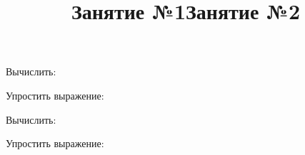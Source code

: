 \title{Занятие №1}
\begin{listofex}
	\item {}
	\item {}
	\item {}
	\item {}
	\item {}
	\item Вычислить:
	\begin{enumcols}[itemcolumns=3]
		\item {}
		\item {}
		\item {}
	\end{enumcols}
	\item {}
	\item {}
	\item {}
	\item {}
	\item {}
	\item Упростить выражение:
	\begin{enumcols}[itemcolumns=2]
		\item {}
		\item {}
	\end{enumcols}
\end{listofex}
\newpage
\title{Занятие №2}
\begin{listofex}
	\item {}
	\item {}
	\item {}
	\item {}
	\item {}
	\item Вычислить:
	\begin{enumcols}[itemcolumns=3]
		\item {}
		\item {}
		\item {}
	\end{enumcols}
	\item {}
	\item {}
	\item {}
	\item {} 
	\item {}
	\item Упростить выражение:
	\begin{enumcols}[itemcolumns=2]
		\item {}
		\item {}
	\end{enumcols}
	\item {}
\end{listofex}
